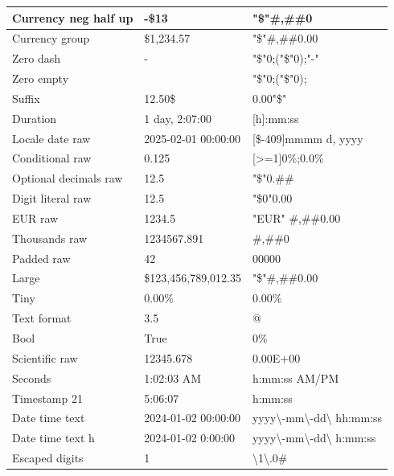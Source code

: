 \documentclass[11pt,a4paper]{article}
\begin{document}
\begin{table}[h]
\begin{tabular}{|l|l|l|}
Currency neg half up & -\$13 & "\$"\#,\#\#0 \\ \hline
Currency group & \$1,234.57 & "\$"\#,\#\#0.00 \\ \hline
Zero dash & - & "\$"0;("\$"0);"-" \\ \hline
Zero empty &  & "\$"0;("\$"0); \\ \hline
Suffix & 12.50\$ & 0.00"\$" \\ \hline
Duration & 1 day, 2:07:00 & [h]:mm:ss \\ \hline
Locale date raw & 2025-02-01 00:00:00 & [\$-409]mmmm d, yyyy \\ \hline
Conditional raw & 0.125 & [>=1]0\%;0.0\% \\ \hline
Optional decimals raw & 12.5 & "\$"0.\#\# \\ \hline
Digit literal raw & 12.5 & "\$0"0.00 \\ \hline
EUR raw & 1234.5 & "EUR" \#,\#\#0.00 \\ \hline
Thousands raw & 1234567.891 & \#,\#\#0 \\ \hline
Padded raw & 42 & 00000 \\ \hline
Large & \$123,456,789,012.35 & "\$"\#,\#\#0.00 \\ \hline
Tiny & 0.00\% & 0.00\% \\ \hline
Text format & 3.5 & @ \\ \hline
Bool & True & 0\% \\ \hline
Scientific raw & 12345.678 & 0.00E+00 \\ \hline
Seconds & 1:02:03 AM & h:mm:ss AM/PM \\ \hline
Timestamp 21 & 5:06:07 & h:mm:ss \\ \hline
Date time text & 2024-01-02 00:00:00 & yyyy\textbackslash{}-mm\textbackslash{}-dd\textbackslash{} hh:mm:ss \\ \hline
Date time text h & 2024-01-02 0:00:00 & yyyy\textbackslash{}-mm\textbackslash{}-dd\textbackslash{} h:mm:ss \\ \hline
Escaped digits & 1 & \textbackslash{}1\textbackslash{}.0\# \\ \hline
\end{tabular}
\end{table}
\end{document}

